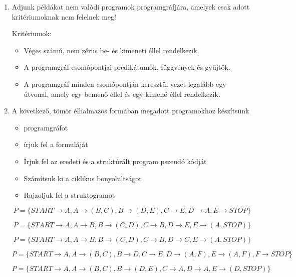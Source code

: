 \documentclass[a4paper]{article}
\newenvironment{solution}
{\color{RoyalBlue}}{\bigskip}
\begin{document}
\begin{enumerate}

\item

Adjunk példákat nem valódi programok programgráfjára, amelyek csak adott kritériumoknak nem felelnek meg!

\begin{solution}
Kritériumok:
\begin{itemize}
\item Véges számú, nem zérus be- és kimeneti éllel rendelkezik.
\item A programgráf csomópontjai predikátumok, függvények és gyűjtők.
\item A programgráf minden csomópontján keresztül vezet legalább egy útvonal, amely egy bemenő éllel és egy kimenő éllel rendelkezik.
\end{itemize}
\end{solution}

\item

A következő, tömör élhalmazos formában megadott programokhoz készítsünk
\begin{itemize}
	\item programgráfot
	\item írjuk fel a formuláját
	\item Írjuk fel az eredeti és a struktúrált program pszeudó kódját
	\item Számítsuk ki a ciklikus bonyolultságot
	\item Rajzoljuk fel a struktogramot
\end{itemize}

$$
P = \{START \rightarrow A, A \rightarrow (B, C), B \rightarrow (D, E), C \rightarrow E, D \rightarrow A, E \rightarrow STOP\}
$$

$$
P = \{START \rightarrow A, A \rightarrow B, B \rightarrow (C, D), C \rightarrow B, D \rightarrow E, E \rightarrow (A, STOP)\}
$$

$$
P = \{START \rightarrow A, A \rightarrow B, B \rightarrow (C, D), C \rightarrow B, D \rightarrow C, E \rightarrow (A, STOP)\}
$$

$$
P = \{START \rightarrow A, A \rightarrow (B, C), B \rightarrow D, C \rightarrow E, D \rightarrow (A, F), E \rightarrow (A, F), F \rightarrow STOP\}
$$

$$
P = \{
START \rightarrow A, A \rightarrow (B, C), B \rightarrow (D, E), C \rightarrow A, D \rightarrow A, E \rightarrow (D, STOP)
\}
$$


\end{enumerate}
\end{document}
